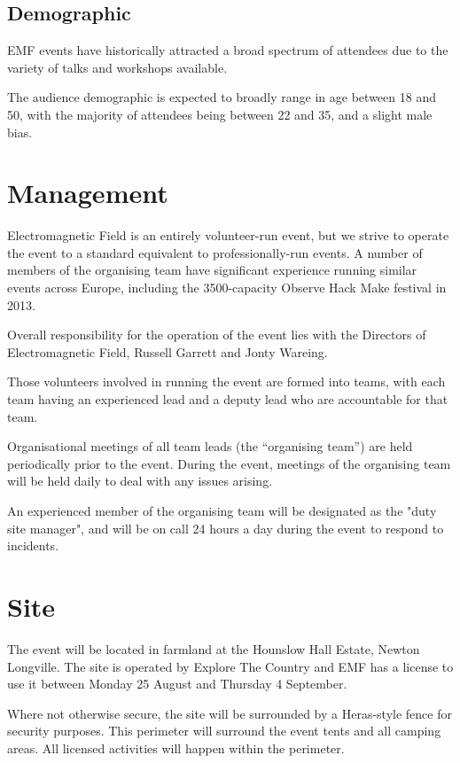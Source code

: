\subsection{Demographic}

EMF events have historically attracted a broad spectrum of attendees due to the variety of talks
and workshops available.

The audience demographic is expected to broadly range in age between 18 and 50, with the majority
of attendees being between 22 and 35, and a slight male bias.

\section{Management}

Electromagnetic Field is an entirely volunteer-run event, but we strive to operate the event to
a standard equivalent to professionally-run events. A number of members of the organising team have
significant experience running similar events across Europe, including the 3500-capacity
Observe Hack Make festival in 2013.

Overall responsibility for the operation of the event lies with the Directors of Electromagnetic Field, Russell Garrett and Jonty Wareing.

Those volunteers involved in running the event are formed into teams, with each team having an
experienced lead and a deputy lead who are accountable for that team.

Organisational meetings of all team leads (the ``organising team'') are held periodically prior to the event.
During the event, meetings of the organising team will be held daily to deal with any issues arising.

An experienced member of the organising team will be designated as the "duty site manager", and will be  on call 24 hours a day during the event to respond to incidents.

\section{Site}

The event will be located in farmland at the Hounslow Hall Estate, Newton Longville.
The site is operated by Explore The Country and EMF has a license to use it between
Monday 25 August and Thursday 4 September.

Where not otherwise secure, the site will be surrounded by a Heras-style fence for security purposes.
This perimeter will surround the event tents and all camping areas. All licensed activities will happen
within the perimeter.

